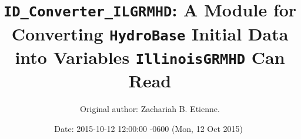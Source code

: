 \documentclass{article}
\begin{document}
\title{{\tt ID\_Converter\_ILGRMHD}: A Module for Converting {\tt HydroBase} Initial Data into Variables {\tt IllinoisGRMHD} Can Read}

\author{Original author: Zachariah B. Etienne. }

\date{$ $Date: 2015-10-12 12:00:00 -0600 (Mon, 12 Oct 2015) $ $}
\maketitle

%
%  
%                                                    
\end{document}
